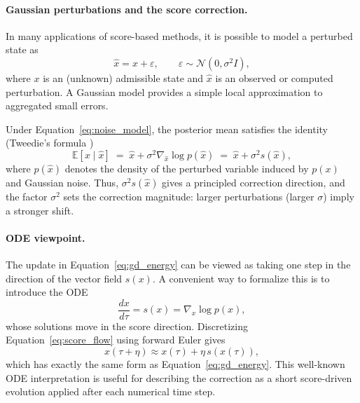 \documentclass[letterpaper]{article} %
\def\Eqref#1{Equation~\ref{#1}}
\providecommand{\Eqref}[1]{\Cref{#1}}
\begin{document}
\paragraph{Gaussian perturbations and the score correction.}
In many applications of score-based methods, it is possible to model a perturbed state as
\begin{equation}\label{eq:noise_model}
\hat{x} = x + \varepsilon, \qquad \varepsilon \sim \mathcal{N}(0,\sigma^2 I),
\end{equation}
where $x$ is an (unknown) admissible state and $\hat{x}$ is an observed or computed perturbation.
A Gaussian model provides a simple local approximation to aggregated small errors.

Under \Eqref{eq:noise_model}, the posterior mean satisfies the identity (Tweedie's formula \citep{Efron2011Tweedie})
\begin{equation}\label{eq:tweedie_statement}
\mathbb{E}[x \mid \hat{x}]
\;=\;
\hat{x} + \sigma^2 \nabla_{\hat{x}} \log p(\hat{x})
\;=\;
\hat{x} + \sigma^2 s(\hat{x}),
\end{equation}
where $p(\hat{x})$ denotes the density of the perturbed variable induced by $p(x)$ and Gaussian noise.
Thus, $\sigma^2 s(\hat{x})$ gives a principled correction direction, and the factor $\sigma^2$
sets the correction magnitude: larger perturbations (larger $\sigma$) imply a stronger shift.


\paragraph{ODE viewpoint.}
The update in \Eqref{eq:gd_energy} can be viewed as taking one step in the direction of the vector field $s(x)$.
A convenient way to formalize this is to introduce the ODE
\begin{equation}\label{eq:score_flow}
\frac{dx}{d\tau} = s(x) = \nabla_x \log p(x),
\end{equation}
whose solutions move in the score direction. Discretizing \Eqref{eq:score_flow} using forward Euler gives
\begin{equation}\label{eq:euler_score}
x(\tau+\eta) \approx x(\tau) + \eta\, s(x(\tau)),
\end{equation}
which has exactly the same form as \Eqref{eq:gd_energy}. This well-known  ODE interpretation is useful for
describing the correction as a short score-driven evolution applied after each numerical time step.
\end{document}

